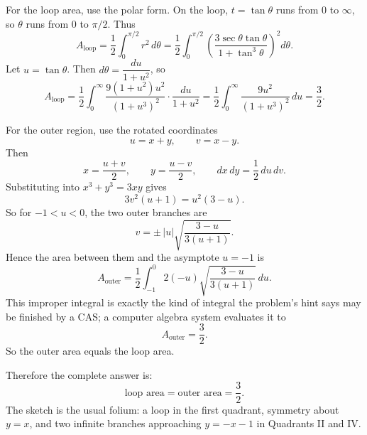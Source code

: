 \documentclass[a4paper,12pt,twocolumn]{article}
\newenvironment{solutionbox}{\begin{framed}}{\end{framed}}
\begin{document}
\begin{solutionbox}
\begin{steps}
\item For the loop area, use the polar form. On the loop, \(t=\tan\theta\) runs from \(0\) to \(\infty\), so \(\theta\) runs from \(0\) to \(\pi/2\). Thus
\[
A_{\text{loop}}
=\frac12\int_0^{\pi/2} r^2\,d\theta
=\frac12\int_0^{\pi/2}
\left(\frac{3\sec\theta\tan\theta}{1+\tan^3\theta}\right)^2 d\theta.
\]
Let \(u=\tan\theta\). Then \(d\theta=\dfrac{du}{1+u^2}\), so
\[
A_{\text{loop}}
=\frac12\int_0^\infty
\frac{9(1+u^2)u^2}{(1+u^3)^2}\cdot\frac{du}{1+u^2}
=\frac12\int_0^\infty\frac{9u^2}{(1+u^3)^2}\,du
=\frac32.
\]

\item For the outer region, use the rotated coordinates
\[
u=x+y,\qquad v=x-y.
\]
Then
\[
x=\frac{u+v}{2},\qquad y=\frac{u-v}{2},
\qquad dx\,dy=\frac12\,du\,dv.
\]
Substituting into \(x^3+y^3=3xy\) gives
\[
3v^2(u+1)=u^2(3-u).
\]
So for \(-1<u<0\), the two outer branches are
\[
v=\pm\,|u|\sqrt{\frac{3-u}{3(u+1)}}.
\]
Hence the area between them and the asymptote \(u=-1\) is
\[
A_{\text{outer}}
=\frac12\int_{-1}^{0}
2(-u)\sqrt{\frac{3-u}{3(u+1)}}\,du.
\]
This improper integral is exactly the kind of integral the problem's hint says may be finished by a CAS; a computer algebra system evaluates it to
\[
\boxed{A_{\text{outer}}=\frac32.}
\]
So the outer area equals the loop area.

\item Therefore the complete answer is:
\[
\boxed{\text{loop area}=\text{outer area}=\frac32.}
\]
The sketch is the usual folium: a loop in the first quadrant, symmetry about \(y=x\), and two infinite branches approaching \(y=-x-1\) in Quadrants II and IV.
\end{steps}
\end{solutionbox}
\end{document}
